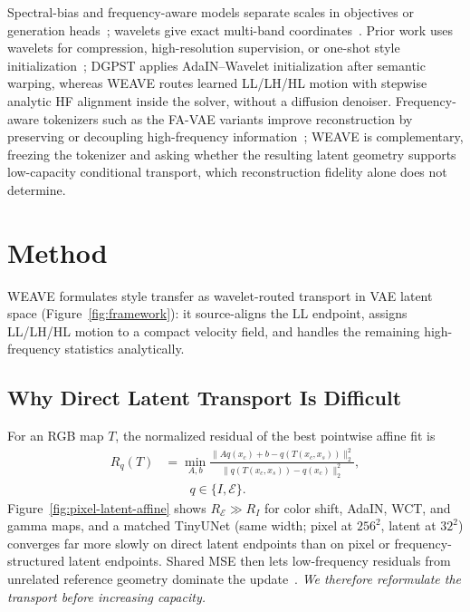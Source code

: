 \documentclass[letterpaper]{article} %
\begin{document}
Spectral-bias and frequency-aware models separate scales in objectives or generation heads~\cite{rahaman2019spectral,xu2022frequency,cai2021fdit,ren2026freqflow}; wavelets give exact multi-band coordinates~\cite{phung2023wavelet,yoo2019photorealistic,daubechies1992ten}. Prior work uses wavelets for compression, high-resolution supervision, or one-shot style initialization~\cite{sadat2024litevae,sigillo2025latentwavelet,zhang2025diffusion4k,wang2025dgpst}; DGPST applies AdaIN--Wavelet initialization after semantic warping, whereas WEAVE routes learned LL/LH/HL motion with stepwise analytic HF alignment inside the solver, without a diffusion denoiser. Frequency-aware tokenizers such as the FA-VAE variants improve reconstruction by preserving or decoupling high-frequency information~\cite{lin2023favae,yin2025favae}; WEAVE is complementary, freezing the tokenizer and asking whether the resulting latent geometry supports low-capacity conditional transport, which reconstruction fidelity alone does not determine.


\section{Method}
\label{sec:method}

WEAVE formulates style transfer as wavelet-routed transport in VAE latent space
(Figure~\ref{fig:framework}): it source-aligns the LL endpoint, assigns LL/LH/HL motion to a
compact velocity field, and handles the remaining high-frequency statistics analytically.



\subsection{Why Direct Latent Transport Is Difficult}
\label{sec:why-hard}

For an RGB map $T$, the normalized residual of the best pointwise affine fit is
\begin{equation}
\begin{aligned}
R_q(T)&=\min_{A,b}
\frac{\|Aq(x_c)+b-q(T(x_c,x_s))\|_2^2}
{\|q(T(x_c,x_s))-q(x_c)\|_2^2},\\
&\qquad q\in\{I,\mathcal E\}.
\end{aligned}
\label{eq:affine-representability}
\end{equation}
Figure~\ref{fig:pixel-latent-affine} shows $R_{\mathcal E}\!\gg\!R_I$ for color shift,
AdaIN, WCT, and gamma maps, and a matched TinyUNet (same width; pixel at $256^2$, latent at
$32^2$) converges far more slowly on direct latent endpoints than on pixel or
frequency-structured latent endpoints. Shared MSE then lets low-frequency residuals from
unrelated reference geometry dominate the
update~\cite{rahaman2019spectral,xu2022frequency,cai2021fdit}. \emph{We therefore
reformulate the transport before increasing capacity.}
\end{document}
